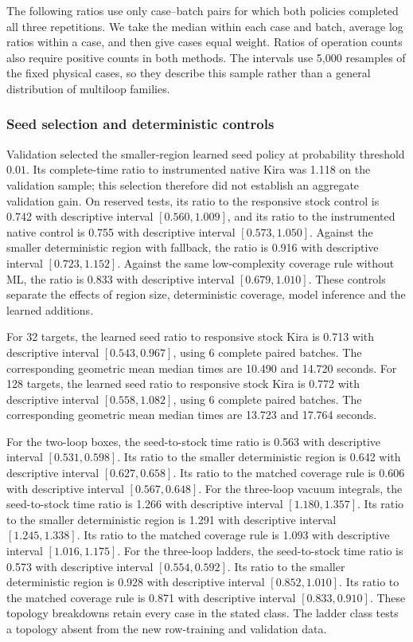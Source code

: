 The following ratios use only case--batch pairs for which both policies completed all three repetitions. We take the median within each case and batch, average log ratios within a case, and then give cases equal weight. Ratios of operation counts also require positive counts in both methods. The intervals use 5,000 resamples of the fixed physical cases, so they describe this sample rather than a general distribution of multiloop families.

\subsubsection{Seed selection and deterministic controls}
Validation selected the smaller-region learned seed policy at probability threshold $0.01$. Its complete-time ratio to instrumented native Kira was 1.118 on the validation sample; this selection therefore did not establish an aggregate validation gain. On reserved tests, its ratio to the responsive stock control is 0.742 with descriptive interval $[0.560,1.009]$, and its ratio to the instrumented native control is 0.755 with descriptive interval $[0.573,1.050]$. Against the smaller deterministic region with fallback, the ratio is 0.916 with descriptive interval $[0.723,1.152]$. Against the same low-complexity coverage rule without ML, the ratio is 0.833 with descriptive interval $[0.679,1.010]$. These controls separate the effects of region size, deterministic coverage, model inference and the learned additions.

For 32 targets, the learned seed ratio to responsive stock Kira is 0.713 with descriptive interval $[0.543,0.967]$, using 6 complete paired batches. The corresponding geometric mean median times are 10.490 and 14.720 seconds. For 128 targets, the learned seed ratio to responsive stock Kira is 0.772 with descriptive interval $[0.558,1.082]$, using 6 complete paired batches. The corresponding geometric mean median times are 13.723 and 17.764 seconds. 

For the two-loop boxes, the seed-to-stock time ratio is 0.563 with descriptive interval $[0.531,0.598]$. Its ratio to the smaller deterministic region is 0.642 with descriptive interval $[0.627,0.658]$. Its ratio to the matched coverage rule is 0.606 with descriptive interval $[0.567,0.648]$. For the three-loop vacuum integrals, the seed-to-stock time ratio is 1.266 with descriptive interval $[1.180,1.357]$. Its ratio to the smaller deterministic region is 1.291 with descriptive interval $[1.245,1.338]$. Its ratio to the matched coverage rule is 1.093 with descriptive interval $[1.016,1.175]$. For the three-loop ladders, the seed-to-stock time ratio is 0.573 with descriptive interval $[0.554,0.592]$. Its ratio to the smaller deterministic region is 0.928 with descriptive interval $[0.852,1.010]$. Its ratio to the matched coverage rule is 0.871 with descriptive interval $[0.833,0.910]$. These topology breakdowns retain every case in the stated class. The ladder class tests a topology absent from the new row-training and validation data.

